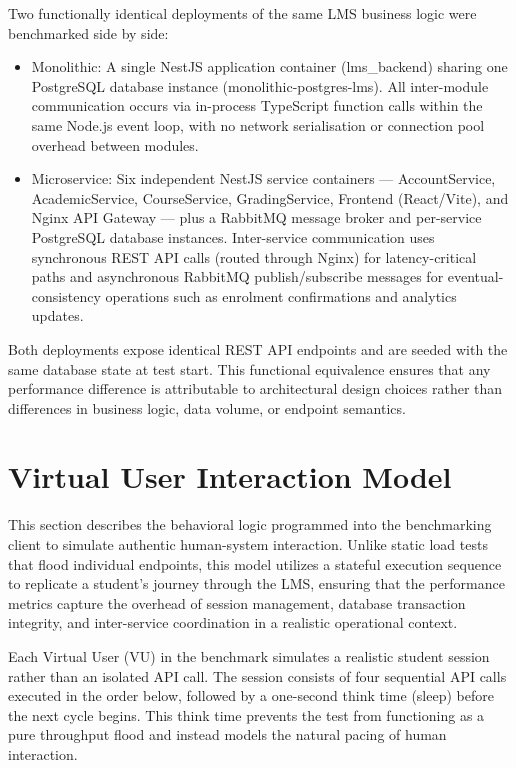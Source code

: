 Two functionally identical deployments of the same LMS business logic were benchmarked side by side:

\begin{itemize}
    \item Monolithic: A single NestJS application container (lms\_backend) sharing one PostgreSQL 
    database instance (monolithic-postgres-lms). All inter-module communication occurs via in-process 
    TypeScript function calls within the same Node.js event loop, with no network serialisation or 
    connection pool overhead between modules.
    \item Microservice: Six independent NestJS service containers — AccountService, AcademicService, 
    CourseService, GradingService, Frontend (React/Vite), and Nginx API Gateway — plus a RabbitMQ message 
    broker and per-service PostgreSQL database instances. Inter-service communication uses synchronous 
    REST API calls (routed through Nginx) for latency-critical paths and asynchronous RabbitMQ 
    publish/subscribe messages for eventual-consistency operations such as enrolment confirmations and analytics updates.
\end{itemize}	

Both deployments expose identical REST API endpoints and are seeded with the same database state 
at test start. This functional equivalence ensures that any performance difference is attributable 
to architectural design choices rather than differences in business logic, data volume, or endpoint semantics.

\section{Virtual User Interaction Model}

This section describes the behavioral logic programmed into the benchmarking client to simulate authentic human-system interaction. Unlike static load tests that flood individual endpoints, this model utilizes a stateful execution sequence to replicate a student’s journey through the LMS, ensuring that the performance metrics capture the overhead of session management, database transaction integrity, and inter-service coordination in a realistic operational context.

Each Virtual User (VU) in the benchmark simulates a realistic student session rather than an 
isolated API call. The session consists of four sequential API calls executed in the order below, 
followed by a one-second think time (sleep) before the next cycle begins. This think time prevents 
the test from functioning as a pure throughput flood and instead models the natural pacing of human interaction.

